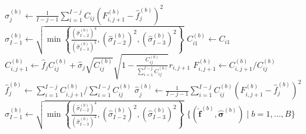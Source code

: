\documentclass[a4paper]{book}
\begin{document}
\begin{algorithm}
\begin{algorithmic}
              \State $\displaystyle \widehat{\sigma}^{(b)}_j \gets \frac{1}{I - j - 1}\sum_{i = 1}^{I - j} C_{ij} \left( F^{(b)}_{i, j + 1} - \widehat{f}^{(b)}_j \right)^2$
              \vspace{5pt}
            \Else
              \vspace{5pt}
              \State $\widehat{\sigma}^{(b)}_{I - 1} \gets \sqrt{\min{ \left \{ \displaystyle \frac{(\widehat{\sigma}^{(b)}_{I - 2})^4}{(\widehat{\sigma}^{(b)}_{I - 3})^2}, (\widehat{\sigma}^{(b)}_{I - 2})^2, (\widehat{\sigma}^{(b)}_{I - 3})^2 \right \} }}$
              \vspace{5pt}
            \EndIf
          \EndFor
        \Else
            \vspace{5pt}
            \State $C^{(b)}_{i1} \gets C_{i1}$
            \vspace{5pt}
          \EndFor
              \vspace{5pt}
              \State $C^{(b)}_{i, j + 1} \gets \widehat{f}_j C^{(b)}_{ij} + \widehat{\sigma}_j \sqrt{C^{(b)}_{ij}} \sqrt{1 - \frac{{C^{(b)}_{ij}}}{\sum_{i = 1}^{I - j} C^{(b)}_{ij}}} r_{i, j + 1}$
              \vspace{5pt}
              \State $\displaystyle F^{(b)}_{i, j + 1} \gets C^{(b)}_{i, j + 1} / C^{(b)}_{ij}$
              \vspace{5pt}
            \EndFor
            \vspace{5pt}
            \State $\widehat{f}^{(b)}_j \gets \sum_{i = 1}^{I - j} C^{(b)}_{i, j + 1} / \sum_{i = 1}^{I - j} C^{(b)}_{ij}$
            \vspace{5pt}
              \State $\displaystyle \widehat{\sigma}^{(b)}_j \gets \frac{1}{I - j - 1}\sum_{i = 1}^{I-j} C^{(b)}_{ij}\left( F^{(b)}_{i, j + 1} - \widehat{f}^{(b)}_j \right)^2$
            \Else
              \vspace{5pt}
              \State $\widehat{\sigma}^{(b)}_{I - 1} \gets \sqrt{\min{ \left \{ \displaystyle \frac{(\widehat{\sigma}^{(b)}_{I - 2})^4}{(\widehat{\sigma}^{(b)}_{I - 3})^2}, (\widehat{\sigma}^{(b)}_{I - 2})^2, (\widehat{\sigma}^{(b)}_{I - 3})^2 \right \} }}$
              \vspace{5pt}
            \EndIf
          \EndFor
          \vspace{5pt}
        \EndIf
    \EndFor
    \State \Return $\{ (\widehat{\bm{f}}^{(b)}, \widehat{\bm{\sigma}}^{(b)}) \mid b = 1, \dots, B \}$
  \end{algorithmic}
\end{algorithm}
\end{document}
